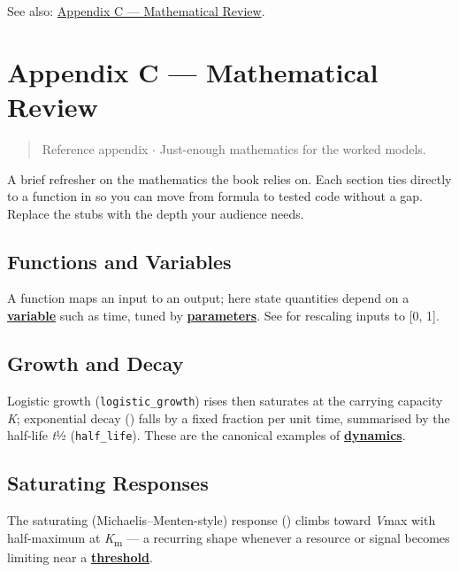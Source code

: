 \documentclass[
]{article}
\theoremstyle{plain}
\theoremstyle{definition}
\begin{document}
See also: \href{appendix_math_review.md}{Appendix C --- Mathematical
Review}.

\newpage

\section{Appendix C --- Mathematical
Review}\label{sec:appendix_math_review}

\begin{quote}
Reference appendix \texorpdfstring{\ensuremath{\cdot}}{.} Just-enough mathematics for the worked models.
\end{quote}

A brief refresher on the mathematics the book relies on. Each section
ties directly to a function in
\href{../../src/textbook/models.py}{} so
you can move from formula to tested code without a gap. Replace the
stubs with the depth your audience needs.

\subsection{Functions and Variables}\label{functions-and-variables}

A function maps an input to an output; here state quantities depend on a
\href{../glossary.md\#gl:variable}{\textbf{variable}} such as time,
tuned by \href{../glossary.md\#gl:parameter}{\textbf{parameters}}. See
 for rescaling inputs to {[}0, 1{]}.

\subsection{Growth and Decay}\label{growth-and-decay}

Logistic growth (\texttt{logistic\_growth}) rises then saturates at the
carrying capacity \emph{K}; exponential decay
() falls by a fixed fraction per unit time,
summarised by the half-life \emph{t}½ (\texttt{half\_life}). These are
the canonical examples of
\href{../glossary.md\#gl:dynamics}{\textbf{dynamics}}.

\subsection{Saturating Responses}\label{saturating-responses}

The saturating (Michaelis--Menten-style) response
() climbs toward \emph{V}max with
half-maximum at \emph{K}\texorpdfstring{\textsubscript{m}}{m} --- a recurring shape whenever a resource or
signal becomes limiting near a
\href{../glossary.md\#gl:threshold}{\textbf{threshold}}.
\end{document}
